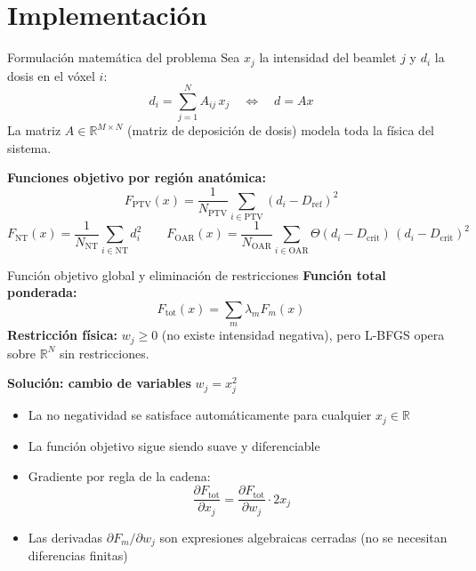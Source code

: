 \documentclass[11pt]{beamer}
\begin{document}
\section{Implementación}

\begin{frame}{Formulación matemática del problema}
Sea $x_j$ la intensidad del beamlet $j$ y $d_i$ la dosis en el vóxel $i$:
\[
    d_i = \sum_{j=1}^{N} A_{ij}\, x_j \quad \Longleftrightarrow \quad d = Ax
\]
La matriz $A \in \mathbb{R}^{M \times N}$ (matriz de deposición de dosis) modela toda la física del sistema.

\medskip
\textbf{Funciones objetivo por región anatómica:}
\[
    F_{\text{PTV}}(x) = \frac{1}{N_{\text{PTV}}} \sum_{i \in \text{PTV}} (d_i - D_{\text{ref}})^2
\]
\[
    F_{\text{NT}}(x) = \frac{1}{N_{\text{NT}}} \sum_{i \in \text{NT}} d_i^2
    \qquad
    F_{\text{OAR}}(x) = \frac{1}{N_{\text{OAR}}} \sum_{i \in \text{OAR}} \Theta(d_i - D_{\text{crit}})\,(d_i - D_{\text{crit}})^2
\]
\end{frame}

\begin{frame}{Función objetivo global y eliminación de restricciones}
\textbf{Función total ponderada:}
\[
    F_{\text{tot}}(x) = \sum_{m} \lambda_m F_m(x)
\]
\textbf{Restricción física:} $w_j \geq 0$ (no existe intensidad negativa), pero L-BFGS opera sobre $\mathbb{R}^N$ sin restricciones.

\medskip
\textbf{Solución: cambio de variables} $w_j = x_j^2$
\begin{itemize}
    \item La no negatividad se satisface automáticamente para cualquier $x_j \in \mathbb{R}$
    \item La función objetivo sigue siendo suave y diferenciable
    \item Gradiente por regla de la cadena:
    \[
        \frac{\partial F_{\text{tot}}}{\partial x_j}
        = \frac{\partial F_{\text{tot}}}{\partial w_j} \cdot 2x_j
    \]
    \item Las derivadas $\partial F_m / \partial w_j$ son expresiones algebraicas cerradas (no se necesitan diferencias finitas)
\end{itemize}
\end{frame}
\end{document}
